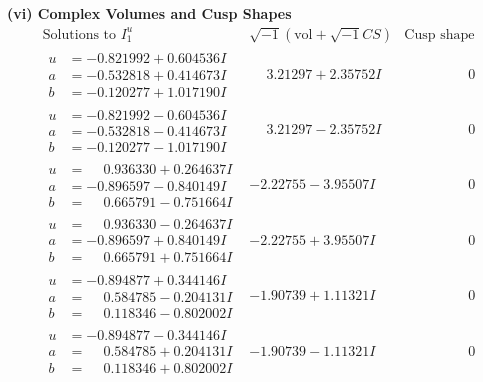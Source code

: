 \documentclass[1p]{elsarticle_modified}
\theoremstyle{definition}
\newcommand{\I}{\sqrt{-1}}
\begin{document}
\newpage\flushleft \textbf{(vi) Complex Volumes and Cusp Shapes}
$$\begin{array}{c|c|c}  
\text{Solutions to }I^u_{1}& \I (\text{vol} + \sqrt{-1}CS) & \text{Cusp shape}\\
 \hline 
\begin{aligned}
u &= -0.821992 + 0.604536 I \\
a &= -0.532818 + 0.414673 I \\
b &= -0.120277 + 1.017190 I\end{aligned}
 & \phantom{-}3.21297 + 2.35752 I & \phantom{-0.000000 } 0 \\ \hline\begin{aligned}
u &= -0.821992 - 0.604536 I \\
a &= -0.532818 - 0.414673 I \\
b &= -0.120277 - 1.017190 I\end{aligned}
 & \phantom{-}3.21297 - 2.35752 I & \phantom{-0.000000 } 0 \\ \hline\begin{aligned}
u &= \phantom{-}0.936330 + 0.264637 I \\
a &= -0.896597 - 0.840149 I \\
b &= \phantom{-}0.665791 - 0.751664 I\end{aligned}
 & -2.22755 - 3.95507 I & \phantom{-0.000000 } 0 \\ \hline\begin{aligned}
u &= \phantom{-}0.936330 - 0.264637 I \\
a &= -0.896597 + 0.840149 I \\
b &= \phantom{-}0.665791 + 0.751664 I\end{aligned}
 & -2.22755 + 3.95507 I & \phantom{-0.000000 } 0 \\ \hline\begin{aligned}
u &= -0.894877 + 0.344146 I \\
a &= \phantom{-}0.584785 - 0.204131 I \\
b &= \phantom{-}0.118346 - 0.802002 I\end{aligned}
 & -1.90739 + 1.11321 I & \phantom{-0.000000 } 0 \\ \hline\begin{aligned}
u &= -0.894877 - 0.344146 I \\
a &= \phantom{-}0.584785 + 0.204131 I \\
b &= \phantom{-}0.118346 + 0.802002 I\end{aligned}
 & -1.90739 - 1.11321 I & \phantom{-0.000000 } 0 \\ \hline\begin{aligned}

\end{aligned}
\end{array}$$
\end{document}
